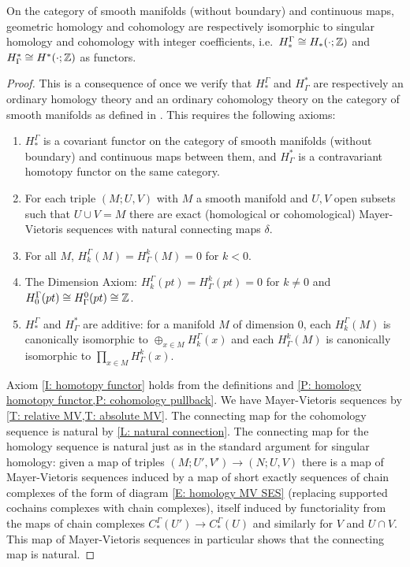 \begin{theorem}\label{T: geometric is singular}
On the category of smooth manifolds (without boundary) and continuous maps, geometric homology and cohomology are respectively isomorphic to singular homology and cohomology with integer coefficients, i.e.\ $H_*^\Gamma \cong H_*(\cdot ;\mathbb{Z})$ and $H^*_\Gamma \cong H^*(\cdot ;\mathbb{Z})$ as functors.
\end{theorem}
\begin{proof}
This is a consequence of \cite[Theorem 10]{Krec10b} once we verify that $H_*^\Gamma$ and $H^*_\Gamma$ are respectively an ordinary homology theory and an ordinary cohomology theory on the category of smooth manifolds as defined in \cite{Krec10b}. This requires the following axioms:

\begin{enumerate}
\item \label{I: homotopy functor} $H_*^\Gamma$ is a covariant functor on the category of smooth manifolds (without boundary) and continuous maps between them, and $H^*_\Gamma$ is a contravariant homotopy functor on the same category.

\item For each triple $(M;U,V)$ with $M$ a smooth manifold and $U,V$ open subsets such that $U \cup V = M$ there are exact (homological or cohomological) Mayer-Vietoris sequences with natural connecting maps $\delta$.


\item\label{I: neg dim} For all $M$, $H_k^\Gamma(M) = H^k_\Gamma(M) = 0$ for $k<0$.


\item The Dimension Axiom: $H_k^\Gamma(pt) = H^k_\Gamma(pt) = 0$ for $k\neq 0$ and $H^\Gamma_0(pt) \cong H_\Gamma^0(pt) \cong \mathbb{Z}$.

\item $H_*^\Gamma$ and $H^*_\Gamma$ are additive: for a manifold $M$ of dimension $0$, each $H_k^\Gamma(M)$ is canonically isomorphic to $\oplus_{x \in M} H_k^\Gamma(x)$ and each $H^k_\Gamma(M)$ is canonically isomorphic to $\prod_{x \in M} H^k_\Gamma(x)$.
\end{enumerate}

Axiom \ref{I: homotopy functor} holds from the definitions and \cref{P: homology homotopy functor,P: cohomology pullback}.
We have Mayer-Vietoris sequences by \cref{T: relative MV,T: absolute MV}. The connecting map for the cohomology sequence is natural by \cref{L: natural connection}. The connecting map for the homology sequence is natural just as in the standard argument for singular homology: given a map of triples $(M;U',V') \to (N;U,V)$ there is a map of Mayer-Vietoris sequences induced by a map of short exactly sequences of chain complexes of the form of diagram \eqref{E: homology MV SES} (replacing supported cochains complexes with chain complexes), itself induced by functoriality from the maps of chain complexes $C_*^{\Gamma}(U') \to C_*^{\Gamma}(U)$ and similarly for $V$ and $U \cap V$. This map of Mayer-Vietoris sequences in particular shows that the connecting map is natural.



\end{proof}
